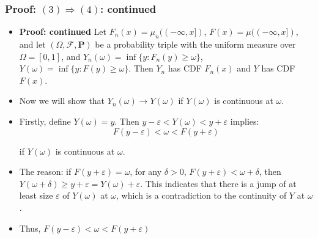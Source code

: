 \documentclass[handout]{beamer}
\newcommand{\BP}{\mathbf{P}}
\begin{document}
\frame
{
  \frametitle{Proof: $(3) \Rightarrow (4)$: continued} 

   \begin{itemize}
          
                     
                     \item<1-> \textbf{Proof: continued} Let $F_n(x)=\mu_n((-\infty, x])$, $F(x)=\mu((-\infty, x])$, and let $(\Omega, \mathcal{F}, \BP)$ be a probability triple with the uniform measure over $\Omega=[0,1]$, and $Y_n(\omega)=\inf \{y: F_n(y) \geq \omega\}$, $Y(\omega)=\inf \{y: F(y) \geq \omega\}$. Then $Y_n$ has CDF $F_n(x)$ and $Y$ has CDF $F(x)$.  
                     
                     
                     \item<2->[-] Now we will show that $Y_n(\omega)\rightarrow Y(\omega)$ if $Y(\omega)$ is continuous at $\omega$. 
                     
                         \item<3->[-] Firstly, define $Y(\omega) = y$. Then $y-\varepsilon<Y(\omega)< y+\varepsilon$ implies:
                                                  $$F(y-\varepsilon)< \omega < F(y+\varepsilon) $$
                         
if $Y(\omega)$ is continuous at $\omega$.
                         
                   
\item<4->[-] The reason: if $F(y+\varepsilon)=\omega$, for any $\delta>0$, $F(y+\varepsilon)<\omega+\delta$, then $Y(\omega+\delta) \ge y+\varepsilon=Y(\omega)+\varepsilon$. This indicates that there is a jump of at least size $\varepsilon$ of $Y(\omega)$ at $\omega$, which is a contradiction to the continuity of $Y$ at $\omega$. 
                   
\item<5->[-] Thus,    $F(y-\varepsilon)<\omega< F(y+\varepsilon) $
                                         
\end{itemize}
}
\end{document}
